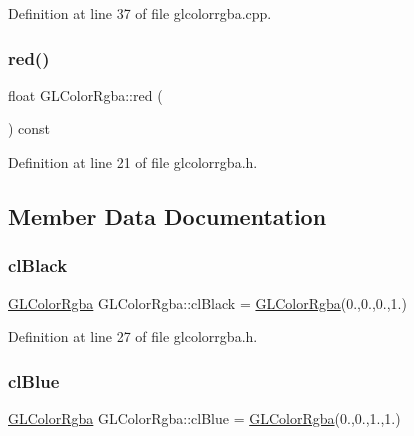 Definition at line 37 of file glcolorrgba.\+cpp.

\mbox{\label{class_g_l_color_rgba_aae8d243708fe5ebb679ff2b3c1df55b3}} 
\subsubsection{\texorpdfstring{red()}{red()}}
{\footnotesize\ttfamily float G\+L\+Color\+Rgba\+::red (\begin{DoxyParamCaption}{ }\end{DoxyParamCaption}) const\hspace{0.3cm}{\ttfamily [inline]}}



Definition at line 21 of file glcolorrgba.\+h.



\subsection{Member Data Documentation}
\mbox{\label{class_g_l_color_rgba_a62741523011318e60e56d56c766ecd50}} 
\subsubsection{\texorpdfstring{clBlack}{clBlack}}
{\footnotesize\ttfamily \mbox{\hyperlink{class_g_l_color_rgba}{G\+L\+Color\+Rgba}} G\+L\+Color\+Rgba\+::cl\+Black = \mbox{\hyperlink{class_g_l_color_rgba}{G\+L\+Color\+Rgba}}(0.,0.,0.,1.)\hspace{0.3cm}{\ttfamily [static]}}



Definition at line 27 of file glcolorrgba.\+h.

\mbox{\label{class_g_l_color_rgba_abf246bb4f542851d17ba84b5143a9214}} 
\subsubsection{\texorpdfstring{clBlue}{clBlue}}
{\footnotesize\ttfamily \mbox{\hyperlink{class_g_l_color_rgba}{G\+L\+Color\+Rgba}} G\+L\+Color\+Rgba\+::cl\+Blue = \mbox{\hyperlink{class_g_l_color_rgba}{G\+L\+Color\+Rgba}}(0.,0.,1.,1.)\hspace{0.3cm}{\ttfamily [static]}}



